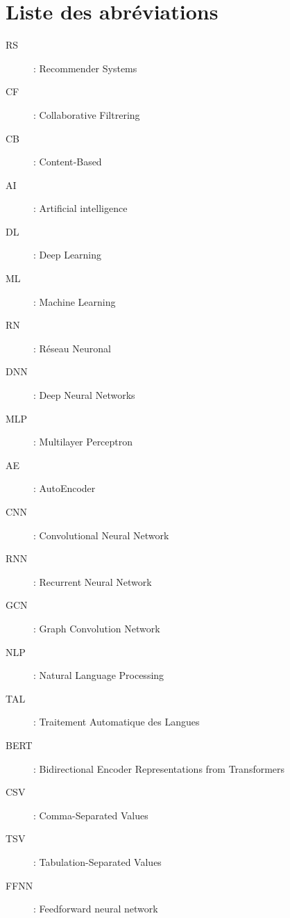 \chapter*{Liste des abréviations}

\begin{description}
\item[RS]: Recommender Systems
\item[CF]: Collaborative Filtrering
\item[CB]: Content‑Based
\item[AI]: Artificial intelligence 
\item[DL]: Deep Learning
\item[ML]: Machine Learning
\item[RN]: Réseau Neuronal
\item[DNN]: Deep Neural Networks
\item[MLP]: Multilayer Perceptron
\item[AE]: AutoEncoder
\item[CNN]: Convolutional Neural Network
\item[RNN]: Recurrent Neural Network
\item[GCN]: Graph Convolution Network
\item[NLP]: Natural Language Processing
\item[TAL]: Traitement Automatique des Langues
\item[BERT]: Bidirectional Encoder Representations from Transformers
\item[CSV]: Comma-Separated Values
\item[TSV]: Tabulation-Separated Values
\item[FFNN]: Feedforward neural network
\end{description}


